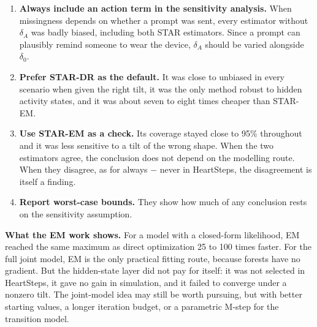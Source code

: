 \documentclass[12pt]{article}
\begin{document}
\begin{enumerate}

\item \textbf{Always include an action term in the sensitivity analysis.} When missingness depends on whether a prompt was sent, every estimator without $\delta_A$ was badly biased, including both STAR estimators. Since a prompt can plausibly remind someone to wear the device, $\delta_A$ should be varied alongside $\delta_0$.

\item \textbf{Prefer STAR-DR as the default.} It was close to unbiased in every scenario when given the right tilt, it was the only method robust to hidden activity states, and it was about seven to eight times cheaper than STAR-EM.

\item \textbf{Use STAR-EM as a check.} Its coverage stayed close to 95\% throughout and it was less sensitive to a tilt of the wrong shape. When the two estimators agree, the conclusion does not depend on the modelling route. When they disagree, as for always $-$ never in HeartSteps, the disagreement is itself a finding.

\item \textbf{Report worst-case bounds.} They show how much of any conclusion rests on the sensitivity assumption.

\end{enumerate}

\textbf{What the EM work shows.} For a model with a closed-form likelihood, EM reached the same maximum as direct optimization 25 to 100 times faster. For the full joint model, EM is the only practical fitting route, because forests have no gradient. But the hidden-state layer did not pay for itself: it was not selected in HeartSteps, it gave no gain in simulation, and it failed to converge under a nonzero tilt. The joint-model idea may still be worth pursuing, but with better starting values, a longer iteration budget, or a parametric M-step for the transition model.
\end{document}
